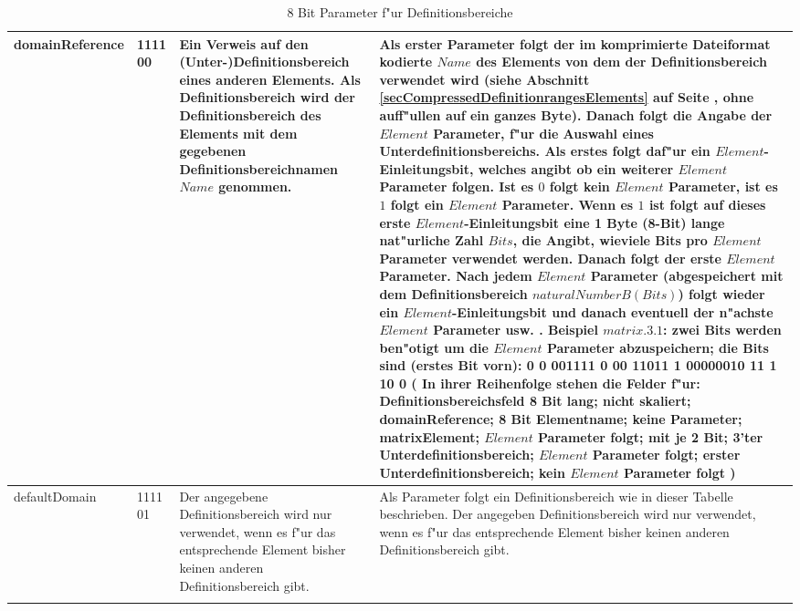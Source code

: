 \begin{center}
\begin{longtable}{|p{25mm}|p{15mm}|p{25mm}|p{60mm}|}
	domainReference & 1111 00 & Ein Verweis auf den (Unter-)Definitionsbereich eines anderen Elements. Als Definitionsbereich wird der Definitionsbereich des Elements mit dem gegebenen Definitions\-bereich\-namen $Name$ genommen. & Als erster Parameter folgt der im komprimierte Dateiformat kodierte $Name$ des Elements von dem der Definitionsbereich verwendet wird (siehe Abschnitt \ref{secCompressedDefinitionrangesElements} auf Seite \pageref{secCompressedDefinitionrangesElements}, ohne auff"ullen auf ein ganzes Byte). Danach folgt die Angabe der $Element$ Parameter, f"ur die Auswahl eines Unterdefinitionsbereichs. Als erstes folgt daf"ur ein $Element$-Einleitungsbit, welches angibt ob ein weiterer $Element$ Parameter folgen. Ist es $0$ folgt kein $Element$ Parameter, ist es $1$ folgt ein $Element$ Parameter. Wenn es $1$  ist folgt auf dieses erste $Element$-Einleitungsbit eine 1 Byte (8-Bit) lange nat"urliche Zahl $Bits$, die Angibt, wieviele Bits pro $Element$ Parameter verwendet werden. Danach folgt der erste $Element$ Parameter. Nach jedem $Element$ Parameter (abgespeichert mit dem Definitionsbereich $naturalNumberB( Bits )$) folgt wieder ein $Element$-Einleitungsbit und danach eventuell der n"achste $Element$ Parameter usw. .  Beispiel $matrix.3.1$: zwei Bits werden ben"otigt um die $Element$ Parameter abzuspeichern; die Bits sind (erstes Bit vorn): 0 0 001111  0 00 11011  1 00000010 11  1 10  0 ( In ihrer Reihenfolge stehen die Felder f"ur: Definitionsbereichsfeld 8 Bit lang; nicht skaliert; domainReference; 8 Bit Elementname; keine Parameter; matrixElement; $Element$ Parameter folgt; mit je 2 Bit; 3'ter Unterdefinitionsbereich; $Element$ Parameter folgt; erster Unterdefinitionsbereich; kein $Element$ Parameter folgt )\\\hline

	defaultDomain & 1111 01 & Der angegebene Definitionsbereich wird nur verwendet, wenn es f"ur das entsprechende Element bisher keinen anderen Definitionsbereich gibt. & Als Parameter folgt ein Definitionsbereich wie in dieser Tabelle beschrieben. Der angegeben Definitionsbereich wird nur verwendet, wenn es f"ur das entsprechende Element bisher keinen anderen Definitionsbereich gibt. \\\hline


\caption{8 Bit Parameter f"ur Definitionsbereiche}
\label{tableCompressedDefinitionRanges}
\end{longtable}
\end{center}


